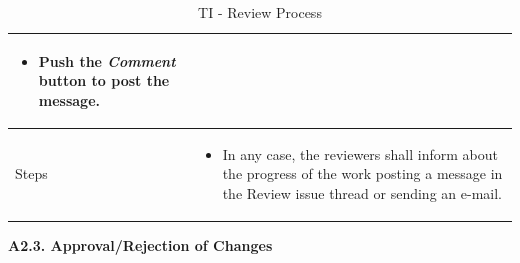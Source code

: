 \documentclass{template/openetcs_article}
\begin{document}
\begin{table}[H]
\begin{tabular}{|m{2cm}|m{12cm}|}
\begin{enumerate}
\begin{itemize}
\item Push the {\it Comment} button to post the message.
\end{itemize}
\end{enumerate}
\\\hline
Steps &
\begin{itemize}
\item In any case, the reviewers shall inform about the progress of the work posting a message in the Review issue thread or sending an e-mail. 
\end{itemize}
\\\hline
\end{tabular}
\caption{TI - Review Process}
\end{table}

\textbf{A2.3. Approval/Rejection of Changes}
\end{document}

